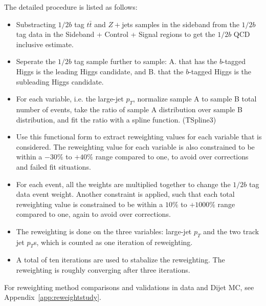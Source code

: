 \clearpage{}
The detailed procedure is listed as follows:
\begin{itemize}
\item Substracting $1/2b$ tag $t\bar{t}$ and $Z+$jets samples in the sideband from the $1/2b$ tag data in the Sideband + Control + Signal regions to get the $1/2b$ QCD inclusive estimate.
\item Seperate the $1/2b$ tag sample further to sample: A. that has the $b$-tagged Higgs is the leading \pt Higgs candidate, and B. that the $b$-tagged Higgs is the subleading \pt Higgs candidate.
\item For each variable, i.e. the large-\R jet $p_{T}$, normalize sample A to sample B total number of events, take the ratio of sample A distribution over sample B distribution, and fit the ratio with a spline function. (TSpline3)
\item Use this functional form to extract reweighting values for each variable that is considered. The reweighting value for each variable is also constrained to be within a $-30\%$ to $+40\%$ range compared to one, to avoid over corrections and failed fit situations. 
\item For each event, all the weights are multiplied together to change the $1/2b$ tag data event weight. Another constraint is applied, such that each total reweighting value is constrained to be within a $10\%$ to $+1000\%$ range compared to one, again to avoid over corrections.
\item The reweighting is done on the three variables: large-\R jet $p_{T}$ and the two track jet $p_{T}$s, which is counted as one iteration of reweighting.
\item A total of ten iterations are used to stabalize the reweighting. The reweighting is roughly converging after three iterations.
\end{itemize}

For reweighting method comparisons and validations in data and Dijet MC, see Appendix~\ref{app:reweightstudy}.

